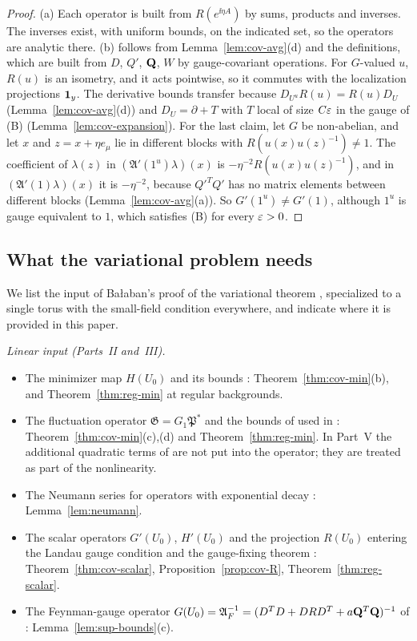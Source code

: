 \begin{proof}
(a) Each operator is built from $R(e^{\ii\eta A})$ by sums, products and inverses. The inverses exist, with uniform bounds, on the indicated set, so the operators are analytic there. (b) follows from Lemma~\ref{lem:cov-avg}(d) and the definitions, which are built from $D$, $Q'$, $\mathbf Q$, $W$ by gauge-covariant operations. For $G$-valued $u$, $R(u)$ is an isometry, and it acts pointwise, so it commutes with the localization projections $\mathbf 1_y$. The derivative bounds transfer because $D_{U^u}R(u)=R(u)D_U$ (Lemma~\ref{lem:cov-avg}(d)) and $D_U=\partial+T$ with $T$ local of size $C\varepsilon$ in the gauge of (B) (Lemma~\ref{lem:cov-expansion}). For the last claim, let $G$ be non-abelian, and let $x$ and $z=x+\eta e_\mu$ lie in different blocks with $R(u(x)u(z)^{-1})\ne1$. The coefficient of $\lambda(z)$ in $(\mathfrak A'(1^u)\lambda)(x)$ is $-\eta^{-2}R(u(x)u(z)^{-1})$, and in $(\mathfrak A'(1)\lambda)(x)$ it is $-\eta^{-2}$, because $Q'^TQ'$ has no matrix elements between different blocks (Lemma~\ref{lem:cov-avg}(a)). So $G'(1^u)\ne G'(1)$, although $1^u$ is gauge equivalent to $1$, which satisfies (B) for every $\varepsilon>0$.
\end{proof}

\subsection{What the variational problem needs}\label{subsec:checklist}

We list the input of Ba\l aban's proof of the variational theorem \cite{BalVar}, specialized to a single torus with the small-field condition everywhere, and indicate where it is provided in this paper.

\emph{Linear input (Parts~II and~III).}
\begin{itemize}
\item The minimizer map $H(U_0)$ and its bounds \cite[(45), (46)]{BalVar}: Theorem~\ref{thm:cov-min}(b), and Theorem~\ref{thm:reg-min} at regular backgrounds.
\item The fluctuation operator $\mathfrak G=G_1\mathfrak P^*$ and the bounds of \cite[Theorem~3.13]{BalBackground} used in \cite[(110)--(120)]{BalVar}: Theorem~\ref{thm:cov-min}(c),(d) and Theorem~\ref{thm:reg-min}. In Part~V the additional quadratic terms of \cite[(79)]{BalVar} are not put into the operator; they are treated as part of the nonlinearity.
\item The Neumann series for operators with exponential decay \cite[(68)--(71)]{BalVar}: Lemma~\ref{lem:neumann}.
\item The scalar operators $G'(U_0)$, $H'(U_0)$ and the projection $R(U_0)$ entering the Landau gauge condition \cite[(21)]{BalVar} and the gauge-fixing theorem \cite[(1.91)--(1.100)]{BalReg}: Theorem~\ref{thm:cov-scalar}, Proposition~\ref{prop:cov-R}, Theorem~\ref{thm:reg-scalar}.
\item The Feynman-gauge operator $G(U_0)=\mathfrak A_F^{-1}=(D^TD+DRD^T+a\mathbf Q^T\mathbf Q)^{-1}$ of \cite[(1.58)]{BalReg}: Lemma~\ref{lem:sup-bounds}(c).
\end{itemize}


